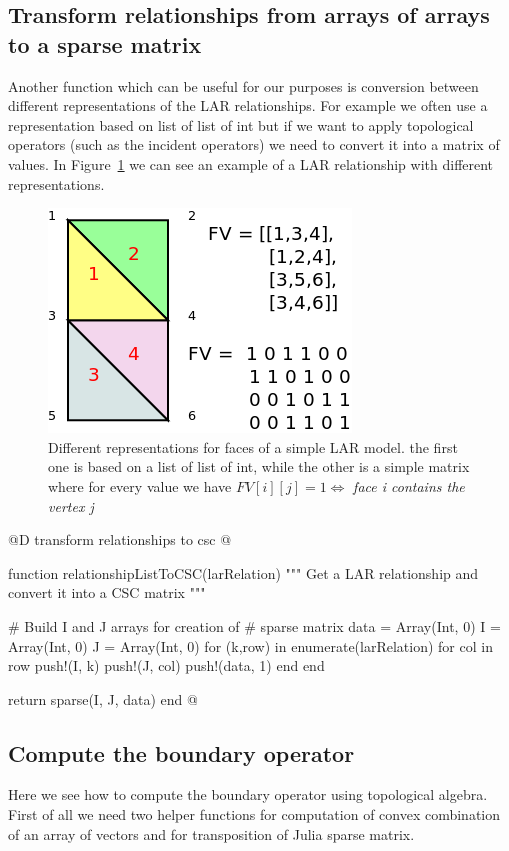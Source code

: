 \documentclass[11pt,oneside]{article}	%
\begin{document}
\subsection{Transform relationships from arrays of arrays to a sparse matrix}\label{sec:transformSparse}

Another function which can be useful for our purposes is conversion between different representations of the LAR relationships. For example we often use a representation based on list of list of int but if we want to apply topological operators (such as the incident operators) we need to convert it into a matrix of values. In Figure~\ref{fig:LARRepresentations} we can see an example of a LAR relationship with different representations.

\begin{figure}[htb] %
   \centering
   \includegraphics[width=0.45\linewidth]{images/LARRepresentations.png}
   \caption{Different representations for faces of a simple LAR model. the first one is based on a list of list of int, while the other is a simple matrix where for every value we have $FV[i][j] = 1 \iff $ \textit{face i contains the vertex j} }
   \label{fig:LARRepresentations}
\end{figure}

@D transform relationships to csc
@{function relationshipListToCSC(larRelation)
  """
  Get a LAR relationship
  and convert it into a CSC matrix
  """

  # Build I and J arrays for creation of
  # sparse matrix
  data = Array(Int, 0)
  I = Array(Int, 0)
  J = Array(Int, 0)
  for (k,row) in enumerate(larRelation)
    for col in row
      push!(I, k)
      push!(J, col)
      push!(data, 1)
    end
  end

  return sparse(I, J, data)
end @}

\subsection{Compute the boundary operator}\label{sec:JuliaBoundaryOperator}
Here we see how to compute the boundary operator using topological algebra.
First of all we need two helper functions for computation of convex combination of an array of vectors and for transposition of Julia sparse matrix.
\end{document}
